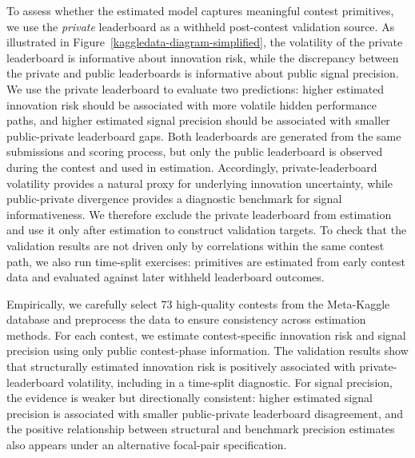 \documentclass[mnsc]{informs3}
\begin{document}
To assess whether the estimated model captures meaningful contest primitives, we use the \textit{private} leaderboard as a withheld post-contest validation source.
As illustrated in Figure~\ref{kaggledata-diagram-simplified}, the volatility of the private leaderboard is informative about innovation risk, while the discrepancy between the private and public leaderboards is informative about public signal precision.
We use the private leaderboard to evaluate two predictions: higher estimated innovation risk should be associated with more volatile hidden performance paths, and higher estimated signal precision should be associated with smaller public-private leaderboard gaps.
Both leaderboards are generated from the same submissions and scoring process, but only the public leaderboard is observed during the contest and used in estimation.
Accordingly, private-leaderboard volatility provides a natural proxy for underlying innovation uncertainty, while public-private divergence provides a diagnostic benchmark for signal informativeness.
We therefore exclude the private leaderboard from estimation and use it only after estimation to construct validation targets.
To check that the validation results are not driven only by correlations within the same contest path, we also run time-split exercises: primitives are estimated from early contest data and evaluated against later withheld leaderboard outcomes.


Empirically, we carefully select 73 high-quality contests from the Meta-Kaggle database and preprocess the data to ensure consistency across estimation methods.
For each contest, we estimate contest-specific innovation risk and signal precision using only public contest-phase information.
The validation results show that structurally estimated innovation risk is positively associated with private-leaderboard volatility, including in a time-split diagnostic.
For signal precision, the evidence is weaker but directionally consistent: higher estimated signal precision is associated with smaller public-private leaderboard disagreement, and the positive relationship between structural and benchmark precision estimates also appears under an alternative focal-pair specification.
\end{document}
